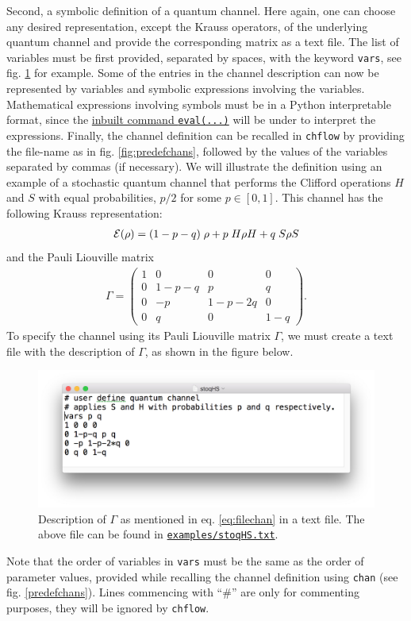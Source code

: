 \documentclass[11pt]{article}
\def\cE{\mathcal{E}}
\begin{document}
Second, a symbolic definition of a quantum channel. Here again, one can choose any desired representation, except the Krauss operators, of the underlying quantum channel and provide the corresponding matrix as a text file. The list of variables must be first provided, separated by spaces, with the keyword \texttt{vars}, see fig. \ref{fig:chandef} for example. Some of the entries in the channel description can now be represented by variables and symbolic expressions involving the variables. Mathematical expressions involving symbols must be in a Python interpretable format, since the \hyperlink{pydoceval}{inbuilt command \texttt{eval(...)}} will be under to interpret the expressions.
Finally, the channel definition can be recalled in \texttt{chflow} by providing the file-name as in fig. \ref{fig:predefchans}, followed by the values of the variables separated by commas (if necessary). We will illustrate the definition using an example of a stochastic quantum channel that performs the Clifford operations $H$ and $S$ with equal probabilities, $p/2$ for some $p\in[0,1]$. This channel has the following Krauss representation:
\begin{gather}
\cE(\rho) = (1 - p - q)\thickspace \rho + p\thickspace H\rho H + q\thickspace S\rho S
\end{gather}
and the Pauli Liouville matrix
\begin{gather}
\Gamma =
\begin{pmatrix}
1 & 0 & 0 & 0 \\
0 & 1-p-q & p & q \\
0 & -p & 1-p-2q & 0 \\
0 & q & 0 & 1-q
\end{pmatrix} . \label{eq:filechan}
\end{gather}
To specify the channel using its Pauli Liouville matrix $\Gamma$, we must create a text file with the description of $\Gamma$, as shown in the figure below.
\begin{figure}[H]
\begin{center}
\includegraphics[scale=0.25]{filechandef.jpg}
\caption{Description of $\Gamma$ as mentioned in eq. \ref{eq:filechan} in a text file. The above file can be found in \href{run ./../examples/stoqHS.txt}{\texttt{examples/stoqHS.txt}}.}
\label{fig:chandef}
\end{center}
\end{figure}
Note that the order of variables in \texttt{vars} must be the same as the order of parameter values, provided while recalling the channel definition using \texttt{chan} (see fig. \ref{predefchans}). Lines commencing with ``\#'' are only for commenting purposes, they will be ignored by \texttt{chflow}.
\end{document}
